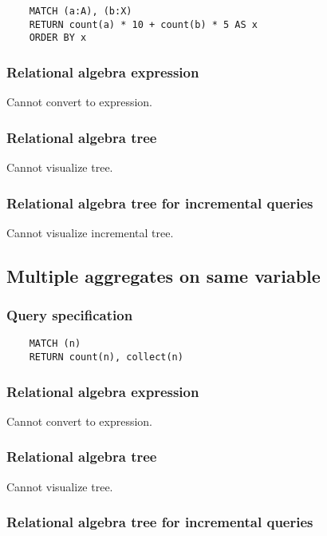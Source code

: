 	\begin{lstlisting}
	MATCH (a:A), (b:X)
	RETURN count(a) * 10 + count(b) * 5 AS x
	ORDER BY x
	\end{lstlisting}


	\subsubsection*{Relational algebra expression}

	Cannot convert to expression.

	\subsubsection*{Relational algebra tree}

	Cannot visualize tree.

	\subsubsection*{Relational algebra tree for incremental queries}

	Cannot visualize incremental tree.
	\subsection{Multiple aggregates on same variable}

	\subsubsection*{Query specification}

	\begin{lstlisting}
	MATCH (n)
	RETURN count(n), collect(n)
	\end{lstlisting}


	\subsubsection*{Relational algebra expression}

	Cannot convert to expression.

	\subsubsection*{Relational algebra tree}

	Cannot visualize tree.

	\subsubsection*{Relational algebra tree for incremental queries}

